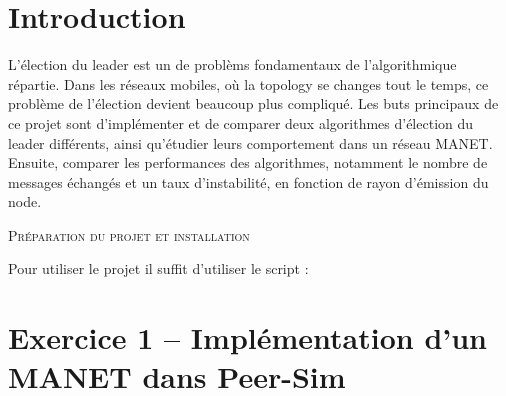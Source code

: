 \documentclass[11pt,a4paper,sans]{report}
\begin{document}
\newpage
\tableofcontents
\vspace*{3cm}
\begingroup\let\clearpage\relax

	\newpage
	\chapter{Introduction}
	L’élection du leader est un de problèms fondamentaux de l'algorithmique répartie. Dans les réseaux mobiles, où la topology se changes tout le temps, ce problème de l’élection devient beaucoup plus compliqué. Les buts principaux de ce projet sont d'implémenter et de comparer deux algorithmes d’élection du leader différents, ainsi qu’étudier leurs comportement dans un réseau MANET. Ensuite, comparer les performances des algorithmes, notamment le nombre de messages échangés et un taux d’instabilité, en fonction de rayon d'émission du node. 


	\begin{comment}
		TODOCHANGEHEREtest1234\cite{greenwade93}
	\end{comment}


	\begin{center}
		\textsc{\large Préparation du projet et installation}
	\end{center}
	\par Pour utiliser le projet il suffit d'utiliser le script :

	\newpage
	\chapter{Exercice 1 – Implémentation d’un MANET dans Peer-Sim}
\end{document}
